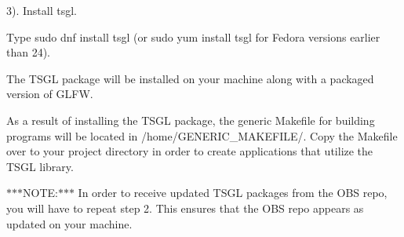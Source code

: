 3). Install tsgl.


\begin{DoxyItemize}
\item Type {\ttfamily sudo dnf install tsgl} (or {\ttfamily sudo yum install tsgl} for Fedora versions earlier than 24).
\end{DoxyItemize}

The T\-S\-G\-L package will be installed on your machine along with a packaged version of G\-L\-F\-W.

As a result of installing the T\-S\-G\-L package, the generic Makefile for building programs will be located in {\ttfamily /home/\-G\-E\-N\-E\-R\-I\-C\-\_\-\-M\-A\-K\-E\-F\-I\-L\-E/}. Copy the Makefile over to your project directory in order to create applications that utilize the T\-S\-G\-L library.

$\ast$$\ast$$\ast$\-N\-O\-T\-E\-:$\ast$$\ast$$\ast$ In order to receive updated T\-S\-G\-L packages from the O\-B\-S repo, you will have to repeat step 2. This ensures that the O\-B\-S repo appears as updated on your machine. 